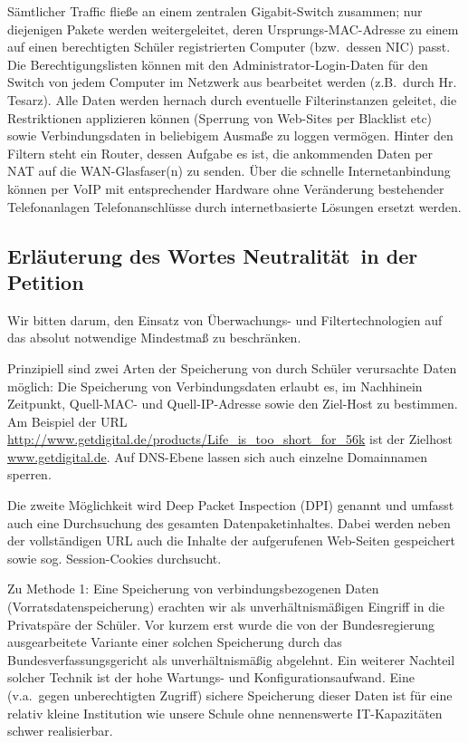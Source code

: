 Sämtlicher Traffic fließe an einem zentralen Gigabit-Switch zusammen; nur diejenigen Pakete werden weitergeleitet, deren Ursprungs-MAC-Adresse zu einem auf einen berechtigten Schüler registrierten Computer (bzw.\ dessen NIC) passt. Die Berechtigungslisten  können mit den Administrator-Login-Daten für den Switch von jedem Computer im Netzwerk aus bearbeitet werden (z.B.\ durch Hr. Tesarz).
Alle Daten werden hernach durch eventuelle Filterinstanzen geleitet, die Restriktionen applizieren können (Sperrung von Web-Sites per Blacklist etc) sowie Verbindungsdaten in beliebigem Ausmaße zu loggen vermögen.
Hinter den Filtern steht ein Router, dessen Aufgabe es ist, die ankommenden Daten per NAT auf die WAN-Glasfaser(n) zu senden.
Über die schnelle Internetanbindung können per VoIP mit entsprechender Hardware ohne Veränderung bestehender Telefonanlagen Telefonanschlüsse durch internetbasierte Lösungen ersetzt werden.

\subsection*{Erläuterung des Wortes \glqq Neutralität\grqq\ in der Petition}
Wir bitten darum, den Einsatz von Überwachungs- und Filtertechnologien auf das absolut notwendige Mindestmaß zu beschränken.

Prinzipiell sind zwei Arten der Speicherung von durch Schüler verursachte Daten möglich: Die Speicherung von Verbindungsdaten erlaubt es, im Nachhinein Zeitpunkt, Quell-MAC- und Quell-IP-Adresse sowie den Ziel-Host zu bestimmen. Am Beispiel der URL \url{http://www.getdigital.de/products/Life_is_too_short_for_56k} ist der Zielhost \url{www.getdigital.de}. Auf DNS-Ebene lassen sich auch einzelne Domainnamen sperren.

Die zweite Möglichkeit wird Deep Packet Inspection (DPI) genannt und umfasst auch eine Durchsuchung des gesamten Datenpaketinhaltes. Dabei werden neben der vollständigen URL auch die Inhalte der aufgerufenen Web-Seiten gespeichert sowie sog. Session-Cookies durchsucht.

Zu Methode 1: Eine Speicherung von verbindungsbezogenen Daten (Vorratsdatenspeicherung) erachten wir als unverhältnismäßigen Eingriff in die Privatspäre der Schüler. Vor kurzem erst wurde die von der Bundesregierung ausgearbeitete Variante einer solchen Speicherung durch das Bundesverfassungsgericht als unverhältnismäßig abgelehnt. Ein weiterer Nachteil solcher Technik ist der hohe Wartungs- und Konfigurationsaufwand. Eine (v.a.\ gegen unberechtigten Zugriff) sichere Speicherung dieser Daten ist für eine relativ kleine Institution wie unsere Schule ohne nennenswerte IT-Kapazitäten schwer realisierbar.

